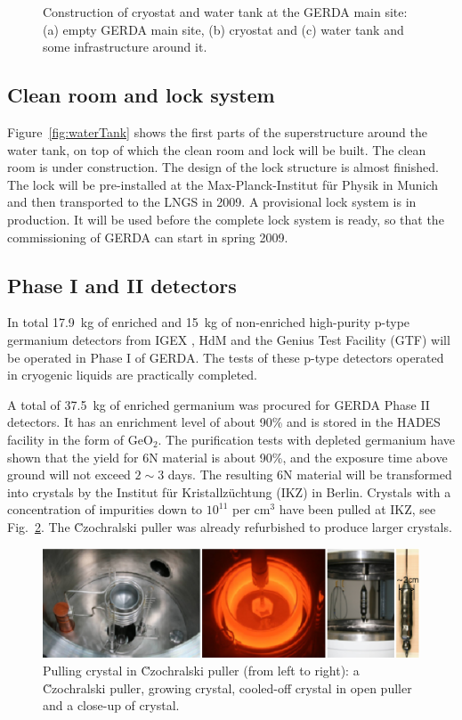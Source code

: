 \begin{figure}[tbhp]
\caption{Construction of cryostat and water tank at the GERDA main
site: (a) empty GERDA main site, (b) cryostat and (c) water tank and
some infrastructure around it.}
\label{fig:cryo}
\end{figure}

\subsection{Clean room and lock system}
\label{sec:gerda:stat2}
Figure~\ref{fig:waterTank} shows the first parts of the superstructure
around the water tank, on top of which the clean room and lock will be
built. The clean room is under construction. The design of the lock
structure is almost finished. The lock will be pre-installed at the
Max-Planck-Institut f\"ur Physik in Munich and then transported to the
LNGS in 2009. A provisional lock system is in production. It will be
used before the complete lock system is ready, so that the
commissioning of GERDA can start in spring 2009.

\subsection{Phase I and II detectors}
\label{sec:gerda:stat3}
In total 17.9~kg of enriched and 15~kg of non-enriched high-purity
p-type germanium detectors from IGEX \cite{Aal02}, HdM \cite{Hei04}
and the Genius Test Facility (GTF) \cite{Kla02} will be operated in
Phase I of GERDA. The tests of these p-type detectors operated in
cryogenic liquids are practically completed.

A total of 37.5~kg of enriched germanium was procured for GERDA Phase
II detectors. It has an enrichment level of about 90\% and is stored
in the HADES facility in the form of GeO$_{2}$. The purification tests
with depleted germanium have shown that the yield for 6N material is
about 90\%, and the exposure time above ground will not exceed $2 \sim
3$ days. The resulting 6N material will be transformed into crystals
by the Institut f\"ur Kristallz\"uchtung (IKZ) in Berlin. Crystals
with a concentration of impurities down to $10^{11}$ per cm$^{3}$ have
been pulled at IKZ, see Fig.~\ref{fig:pulling}. The \u{C}zochralski
puller was already refurbished to produce larger crystals.
\begin{figure}[tbhp]
\centering
\includegraphics[width=\textwidth]{crystalPulling}
\caption{Pulling crystal in \u{C}zochralski puller (from left to
right): a \u{C}zochralski puller, growing crystal, cooled-off crystal
in open puller and a close-up of crystal.}
\label{fig:pulling}
\end{figure}

